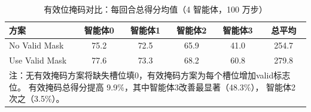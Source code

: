 \begin{table}[htbp]
  \centering
  \caption{ 有效位掩码对比：每回合总得分均值（4 智能体，100 万步）}
  \label{tab:appendix_valid_mask}
  \begin{tabular}{lcccc|c}
    \toprule
    方案 & 智能体0 & 智能体1 & 智能体2 & 智能体3 & 总平均 \\
    \midrule
    No Valid Mask & 75.2 & 72.5 & 65.9 & 41.0 & 254.7 \\
    Use Valid Mask & 77.6 & 73.3 & 68.2 & 60.8 & 279.8 \\
    \midrule
    \multicolumn{6}{p{0.85\textwidth}}{\small 注：无有效掩码方案将缺失槽位填0，有效掩码方案为每个槽位增加valid标志位。
    有效掩码总得分提高 9.9\%，其中智能体3改善最显著（48.3\%），
    智能体2次之（3.5\%）。} \\
    \bottomrule
  \end{tabular}
\end{table}


